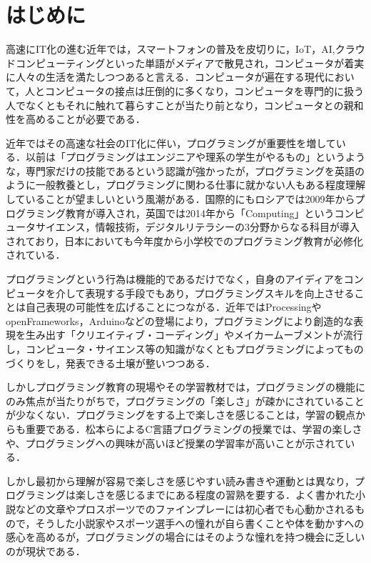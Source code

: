\section{はじめに}

高速にIT化の進む近年では，スマートフォンの普及を皮切りに，IoT，AI,クラウドコンピューティングといった単語がメディアで散見され，コンピュータが着実に人々の生活を満たしつつあると言える．コンピュータが遍在する現代において，人とコンピュータの接点は圧倒的に多くなり，コンピュータを専門的に扱う人でなくともそれに触れて暮らすことが当たり前となり，コンピュータとの親和性を高めることが必要である．

近年ではその高速な社会のIT化に伴い，プログラミングが重要性を増している．以前は「プログラミングはエンジニアや理系の学生がやるもの」というような，専門家だけの技能であるという認識が強かったが，プログラミングを英語のように一般教養とし，プログラミングに関わる仕事に就かない人もある程度理解していることが望ましいという風潮がある．国際的にもロシアでは2009年からプログラミング教育が導入され，英国では2014年から「Computing」というコンピュータサイエンス，情報技術，デジタルリテラシーの3分野からなる科目が導入されており\cite{survey}，日本においても今年度から小学校でのプログラミング教育が必修化されている\cite{guide}．


プログラミングという行為は機能的であるだけでなく，自身のアイディアをコンピュータを介して表現する手段でもあり，プログラミングスキルを向上させることは自己表現の可能性を広げることにつながる．近年ではProcessingやopenFrameworks，Arduinoなどの登場により，プログラミングにより創造的な表現を生み出す「クリエイティブ・コーディング」やメイカームーブメントが流行し，コンピュータ・サイエンス等の知識がなくともプログラミングによってものづくりをし，発表できる土壌が整いつつある．

しかしプログラミング教育の現場やその学習教材では，プログラミングの機能にのみ焦点が当たりがちで，プログラミングの「楽しさ」が疎かにされていることが少なくない．プログラミングをする上で楽しさを感じることは，学習の観点からも重要である．松本らによるC言語プログラミングの授業では、学習の楽しさや、プログラミングへの興味が高いほど授業の学習率が高いことが示されている\cite{matsumoto}．

しかし最初から理解が容易で楽しさを感じやすい読み書きや運動とは異なり，プログラミングは楽しさを感じるまでにある程度の習熟を要する．よく書かれた小説などの文章やプロスポーツでのファインプレーには初心者でも心動かされるもので，そうした小説家やスポーツ選手への憧れが自ら書くことや体を動かすへの感心を高めるが，プログラミングの場合にはそのような憧れを持つ機会に乏しいのが現状である．

